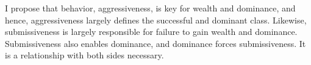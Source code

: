 \documentclass[11pt, letterpaper]{article}
\begin{document}
\begin{spacing}{2.0}


I propose that behavior, aggressiveness, is key for wealth and dominance, and hence,
aggressiveness largely defines the successful and dominant class. Likewise,
submissiveness is largely responsible for failure to gain wealth and
dominance. Submissiveness also enables dominance, and dominance forces
submissiveness. It is a relationship with both sides necessary.



\end{spacing}
\end{document}
